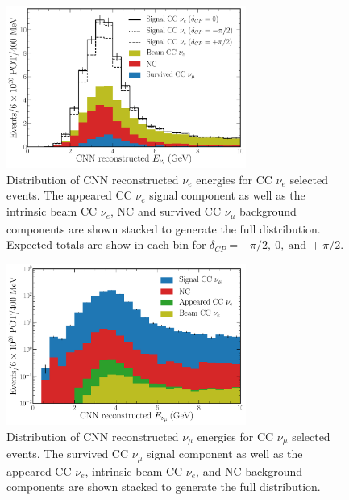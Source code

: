 \begin{figure} %
    \includegraphics[width=0.7\textwidth]{diagrams/7-results/final_nuel_passed_energy_dist.pdf}
    \caption[Distribution of CNN reconstructed $\nu_{e}$ energies for CC $\nu_{e}$ selected events]
    {Distribution of CNN reconstructed $\nu_{e}$ energies for CC $\nu_{e}$ selected events. The
        appeared CC $\nu_{e}$ signal component as well as the intrinsic beam CC $\nu_{e}$, NC and
        survived CC $\nu_{\mu}$ background components are shown stacked to generate the full
        distribution. Expected totals are show in each bin for
        $\delta_{CP}=-\pi/2,~0,~\mathrm{and}~+\pi/2$.}
    \label{fig:final_nuel_passed_energy_dist}
\end{figure}

\begin{figure} %
    \includegraphics[width=0.7\textwidth]{diagrams/7-results/final_numu_passed_energy_dist.pdf}
    \caption[Distribution of CNN reconstructed $\nu_{\mu}$ energies for CC $\nu_{\mu}$ selected events]
    {Distribution of CNN reconstructed $\nu_{\mu}$ energies for CC $\nu_{\mu}$ selected events.
        The survived CC $\nu_{\mu}$ signal component as well as the appeared CC $\nu_{e}$,
        intrinsic beam CC $\nu_{e}$, and NC background components are shown stacked to generate
        the full distribution.}
    \label{fig:final_numu_passed_energy_dist}
\end{figure}

